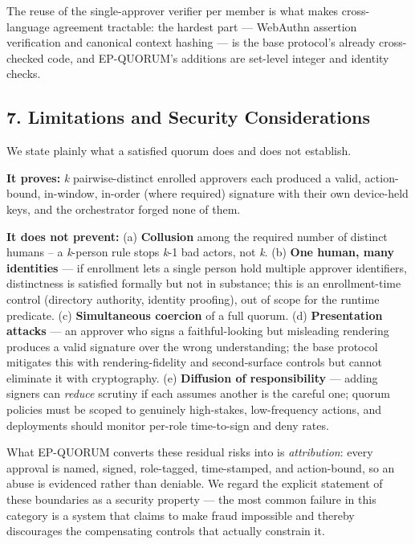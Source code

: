 \documentclass[
  11pt,
]{article}
\newcounter{none} %
\begin{document}
The reuse of the single-approver verifier per member is what makes
cross-language agreement tractable: the hardest part --- WebAuthn
assertion verification and canonical context hashing --- is the base
protocol's already cross-checked code, and EP-QUORUM's additions are
set-level integer and identity checks.

\subsection{7. Limitations and Security
Considerations}\label{limitations-and-security-considerations}

We state plainly what a satisfied quorum does and does not establish.

\textbf{It proves:} \emph{k} pairwise-distinct enrolled approvers each
produced a valid, action-bound, in-window, in-order (where required)
signature with their own device-held keys, and the orchestrator forged
none of them.

\textbf{It does not prevent:} (a) \textbf{Collusion} among the required
number of distinct humans -- a \emph{k}-person rule stops \emph{k}-1 bad
actors, not \emph{k}. (b) \textbf{One human, many identities} --- if
enrollment lets a single person hold multiple approver identifiers,
distinctness is satisfied formally but not in substance; this is an
enrollment-time control (directory authority, identity proofing), out of
scope for the runtime predicate. (c) \textbf{Simultaneous coercion} of a
full quorum. (d) \textbf{Presentation attacks} --- an approver who signs
a faithful-looking but misleading rendering produces a valid signature
over the wrong understanding; the base protocol mitigates this with
rendering-fidelity and second-surface controls but cannot eliminate it
with cryptography. (e) \textbf{Diffusion of responsibility} --- adding
signers can \emph{reduce} scrutiny if each assumes another is the
careful one; quorum policies must be scoped to genuinely high-stakes,
low-frequency actions, and deployments should monitor per-role
time-to-sign and deny rates.

What EP-QUORUM converts these residual risks into is \emph{attribution}:
every approval is named, signed, role-tagged, time-stamped, and
action-bound, so an abuse is evidenced rather than deniable. We regard
the explicit statement of these boundaries as a security property ---
the most common failure in this category is a system that claims to make
fraud impossible and thereby discourages the compensating controls that
actually constrain it.
\end{document}
